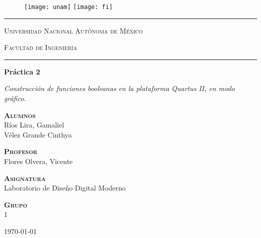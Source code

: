 \documentclass[../main.tex]{subfiles}
\begin{document}
\begin{titlepage}
  \begin{figure}[ht]
    \texttt{[image: unam]}
    \label{EscudoUNAM}
    \endminipage
    \texttt{[image: fi]}
    \label{EscudoFC}
    \endminipage
  \end{figure}

  \begin{center}
    \hrule height 0.5mm
    \vspace{0.2cm}
    \LARGE
    \textsc{Universidad Nacional Autónoma de México}

    \vfill
    \LARGE
    \textsc{Facultad de Ingeniería}
    \vspace{0.4cm}
    \hrule height 0.5mm

    \vfill
    \LARGE
    \textbf{Práctica 2}\\
    \vspace{0.8cm}
    \begin{minipage}{15cm}
      \centering
      \Large
      \textit{Construcción de funciones booleanas en la plataforma Quartus II, 
    en modo gráfico.}
    \end{minipage}

    \vfill
    \large
    {\scshape \bfseries Alumnos}\\
    \vspace{.3cm}
    \large
    Ríos Lira, Gamaliel \\ Vélez Grande Cinthya

    \vfill
    \large
    {\scshape \bfseries Profesor}\\
    \vspace{.3cm}
    \large
    Flores Olvera, Vicente

    \vfill
    \large
    {\scshape \bfseries Asignatura}\\
    \vspace{.3cm}
    \large
    Laboratorio de Diseño Digital Moderno

    \vfill
    \large
    {\scshape \bfseries Grupo}\\
    \vspace{.3cm}
    \large
    1

    \vfill
    \today
  \end{center}
\end{titlepage}
\end{document}
